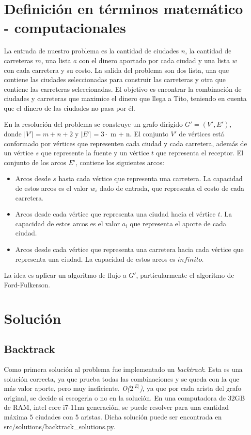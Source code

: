 \documentclass[10pt]{article} %
\begin{document}
	\section{Definici\'on en t\'erminos matem\'atico - computacionales}\label{section_2}
	
	La entrada de nuestro problema es la cantidad de ciudades $n$, la cantidad de carreteras $m$, una lista $a$ con el dinero aportado por cada ciudad y una lista $w$ con cada carretera y su costo. La salida del problema son dos lista, una que contiene las ciudades seleccionadas para construir las carreteras y otra que contiene las carreteras seleccionadas. El objetivo es encontrar la combinaci\'on de ciudades y carreteras que maximice el dinero que llega a Tito, teniendo en cuenta que el dinero de las ciudades no pasa por \'el.
	
	En la resoluci\'on del problema se construye un grafo dirigido $G'=(V',E')$, donde $|V'| = m + n + 2$ y $|E'|= 3 \cdot$ m + n. El conjunto $V'$ de v\'ertices est\'a conformado por v\'ertices que representen cada ciudad y cada carretera, adem\'as de un v\'ertice $s$ que represente la fuente y un v\'ertice $t$ que representa el receptor. El conjunto de los arcos $E'$, contiene los siguientes arcos:
	\begin{itemize}
		\item Arcos desde $s$ hasta cada v\'ertice que representa una carretera. La capacidad de estos arcos es el valor $w_i$ dado de entrada, que representa el costo de cada carretera.
		
		\item Arcos desde cada v\'ertice que representa una ciudad hacia el v\'ertice $t$. La capacidad de estos arcos es el valor $a_i$ que representa el aporte de cada ciudad.
		
		\item Arcos desde cada v\'ertice que representa una carretera hacia cada v\'ertice que representa una ciudad. La capacidad de estos arcos es $infinito$.
		
	\end{itemize}

	La idea es aplicar un algoritmo de flujo a $G'$, particularmente el algoritmo de Ford-Fulkerson. 
	
	\section{Soluci\'on}
	
	\subsection{Backtrack}
		Como primera solución al problema fue implementado un \textit{backtrack}. Esta es una solución correcta, ya que prueba todas las combinaciones y se queda con la que más valor aporte, pero muy ineficiente, \textit{O($2^{|E|}$)}, ya que por cada arista del grafo original, se decide si escogerla o no en la soluci\'on. En una computadora de 32GB de RAM, intel core i7-11na generación, se puede resolver para una cantidad máxima 5 ciudades con 5 aristas. Dicha solución puede ser encontrada en src/solutions/backtrack\_solutions.py.
	
\end{document}
